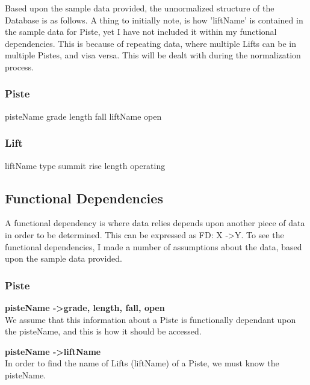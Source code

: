 \documentclass[11pt]{scrartcl} %
\begin{document}
Based upon the sample data provided\cite{sample}, the unnormalized structure of the Database is as follows. A thing to initially note, is how 'liftName' is contained in the sample data for Piste, yet I have not included it within my functional dependencies. This is because of repeating data, where multiple Lifts can be in multiple Pistes, and visa versa. This will be dealt with during the normalization process.

\subsubsection{Piste}
pisteName\newline
grade\newline
length\newline
fall\newline
liftName\newline
open

\subsubsection{Lift}
liftName\newline
type\newline
summit\newline
rise\newline
length\newline
operating\newline

\subsection{Functional Dependencies}
A functional dependency is where data relies depends upon another piece of data in order to be determined. This can be expressed as FD: X -\textgreater \space Y. To see the functional dependencies, I made a number of assumptions about the data, based upon the sample data provided.
\subsubsection{Piste}
 \textbf{pisteName -\textgreater  grade, length, fall, open}
\\[0.1cm]
We assume that this information about a Piste is functionally dependant upon the pisteName, and this is how it should be accessed.

\textbf{pisteName -\textgreater liftName}
\\[0.1cm]
In order to find the name of Lifts (liftName) of a Piste, we must know the pisteName.
\end{document}
